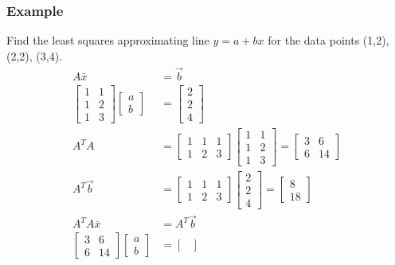 \documentclass{math}
\begin{document}
\subsubsection*{Example}
Find the least squares approximating line \( y = a+bx \) for the data points
(1,2), (2,2), (3,4).
\begin{align*}
  A\bar{x} &= \vec{b} \\
  \begin{bmatrix}
    1 & 1 \\
    1 & 2 \\
    1 & 3
  \end{bmatrix}\begin{bmatrix}a \\ b\end{bmatrix} &= \begin{bmatrix}
    2 \\ 2 \\ 4
  \end{bmatrix} \\
  A^TA &= \begin{bmatrix}
    1 & 1 & 1 \\
    1 & 2 & 3
  \end{bmatrix}\begin{bmatrix}
    1 & 1 \\
    1 & 2 \\
    1 & 3
  \end{bmatrix} = \begin{bmatrix}
    3 & 6 \\
    6 & 14
  \end{bmatrix} \\
  A^T\vec{b} &= \begin{bmatrix}
    1 & 1 & 1 \\
    1 & 2 & 3
  \end{bmatrix}\begin{bmatrix}2 \\ 2 \\ 4\end{bmatrix} = \begin{bmatrix}
    8 \\ 18
  \end{bmatrix} \\
  A^TA\bar{x} &= A^T\vec{b} \\
  \begin{bmatrix}
    3 & 6 \\
    6 & 14
  \end{bmatrix}\begin{bmatrix}a \\ b\end{bmatrix} &= \begin{bmatrix}

\end{bmatrix}
\end{align*}
\end{document}
